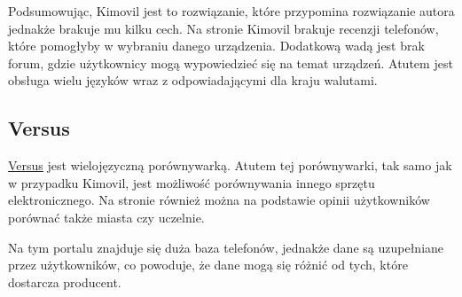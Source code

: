 Podsumowując, Kimovil jest to rozwiązanie, które przypomina rozwiązanie autora jednakże brakuje mu kilku cech. Na stronie Kimovil brakuje recenzji telefonów, które pomogłyby w wybraniu danego urządzenia. Dodatkową wadą jest brak forum, gdzie użytkownicy mogą wypowiedzieć się na temat urządzeń. Atutem jest obsługa wielu języków wraz z odpowiadającymi dla kraju walutami.

\subsection{Versus}
\href{https://versus.com/}{Versus} \cite{versus} jest wielojęzyczną porównywarką. Atutem tej porównywarki, tak samo jak w przypadku Kimovil, jest możliwość porównywania innego sprzętu elektronicznego. Na stronie również można na podstawie opinii użytkowników porównać także miasta czy uczelnie.

Na tym portalu znajduje się duża baza telefonów, jednakże dane są uzupełniane przez użytkowników, co powoduje, że dane mogą się różnić od tych, które dostarcza producent.

